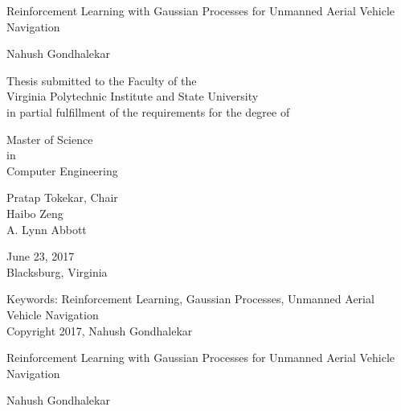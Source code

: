 \documentclass[12pt]{report}
\begin{document}
\thispagestyle{empty}
\begin{center}

{\Large 
Reinforcement Learning with Gaussian Processes for Unmanned Aerial Vehicle Navigation
}

\vfill

Nahush Gondhalekar

\vfill

Thesis submitted to the Faculty of the \\
Virginia Polytechnic Institute and State University \\
in partial fulfillment of the requirements for the degree of

\vfill

Master of Science \\
in \\
Computer Engineering

\vfill

Pratap Tokekar, Chair \\
Haibo Zeng \\
A. Lynn Abbott

\vfill

June 23, 2017 \\
Blacksburg, Virginia

\vfill

Keywords: Reinforcement Learning, Gaussian Processes, Unmanned Aerial Vehicle Navigation
\\
Copyright 2017, Nahush Gondhalekar

\end{center}

\pagebreak

\thispagestyle{empty}
\begin{center}

{\large Reinforcement Learning with Gaussian Processes for Unmanned Aerial Vehicle Navigation}

\vfill

Nahush Gondhalekar

\vfill

\vfill

\end{center}
\end{document}
